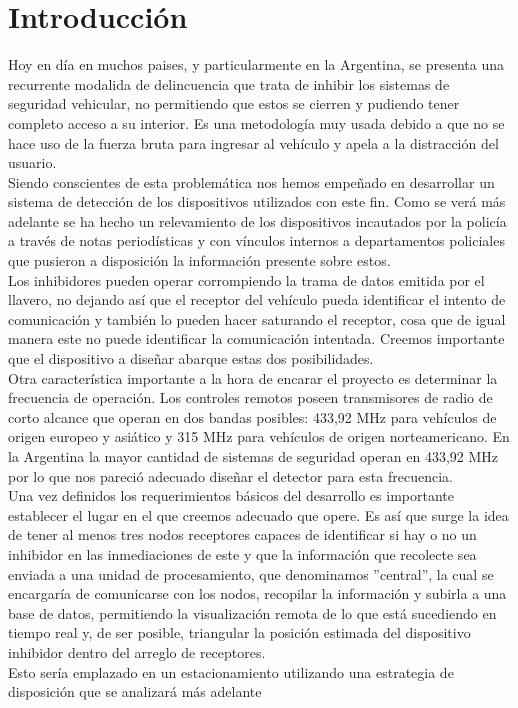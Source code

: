 \documentclass[12pt]{report}
\begin{document}
\chapter{Introducción}
Hoy en día en muchos paises, y particularmente en la Argentina, se presenta una recurrente modalida de delincuencia que trata de 
inhibir los sistemas de seguridad vehicular, no permitiendo que estos se cierren y pudiendo tener completo acceso a su interior. Es 
una metodología muy usada debido a que no se hace uso de la fuerza bruta para ingresar al vehículo y apela a la distracción del usuario.\\
Siendo conscientes de esta problemática nos hemos empeñado en desarrollar un sistema de detección de los dispositivos utilizados
con este fin. Como se verá más adelante se ha hecho un relevamiento de los dispositivos incautados por la policía a través de notas
periodísticas y con vínculos internos a departamentos policiales que pusieron a disposición la información presente sobre estos.\\
Los inhibidores pueden operar corrompiendo la trama de datos emitida por el llavero, no dejando así que el receptor del vehículo 
pueda identificar el intento de comunicación y también lo pueden hacer saturando el receptor, cosa que de igual manera este no puede identificar
la comunicación intentada. Creemos importante que el dispositivo a diseñar abarque estas dos posibilidades. \\
Otra característica importante a la hora de encarar el proyecto es determinar la frecuencia de operación. Los controles remotos poseen transmisores
de radio de corto alcance que operan en dos bandas posibles: 433,92 MHz para vehículos de origen europeo y asiático y 315 MHz para vehículos de origen 
norteamericano. En la Argentina la mayor cantidad de sistemas de seguridad operan en 433,92 MHz por lo que nos pareció adecuado diseñar el
detector para esta frecuencia. \\
Una vez definidos los requerimientos básicos del desarrollo es importante establecer el lugar en el que creemos adecuado que opere. Es así
que surge la idea de tener al menos tres nodos receptores capaces de identificar si hay o no un inhibidor en las inmediaciones de este
y que la información que recolecte sea enviada a una unidad de procesamiento, que denominamos ''central'', la cual se encargaría de 
comunicarse con los nodos, recopilar la información y subirla a una base de datos, permitiendo la visualización remota de lo que está sucediendo 
en tiempo real y, de ser posible, triangular la posición estimada del dispositivo inhibidor dentro del arreglo de receptores.\\
Esto sería emplazado en un estacionamiento utilizando una estrategia de disposición que se analizará más adelante
\end{document}
